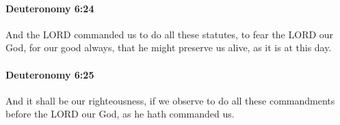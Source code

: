 		\paragraph{Deuteronomy 6:24} %
			\label{DEUTERONOMY-6-24}

			And the LORD commanded us to do all these statutes, to fear the LORD our God, for our good always, that he might preserve us alive, as it is at this day.


		\paragraph{Deuteronomy 6:25} %
			\label{DEUTERONOMY-6-25}

			And it shall be our righteousness, if we observe to do all these commandments before the LORD our God, as he hath commanded us.

